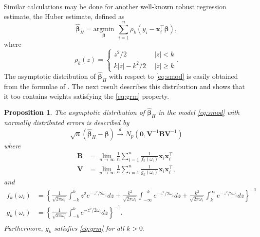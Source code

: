 \documentclass[12pt]{article}
\newtheorem{proposition}{Proposition}
\newcommand{\bl}[1]{{\mathbf #1}}
\newcommand{\bs}[1]{\boldsymbol #1}
\begin{document}
Similar calculations may be done for another well-known robust regression estimate, the Huber estimate, defined as
\begin{equation*}
    \hat{\bs{\beta}}_{H} = \underset{\bs{\beta}}{\mathrm{argmin}}~~ \sum_{i=1}^n \rho_k (y_i - \bl{x}_i^\top \bs{\beta}),
\end{equation*}
where
\begin{equation*}
    \rho_k(z) = \left\{\begin{array}{lc}
         z^2/2 & ~~|z| < k \\
         k|z| - k^2 / 2 & ~~|z| \geq k
    \end{array}\right. .
\end{equation*}
The asymptotic distribution of $\hat{\bs{\beta}}_H$ with respect to \eqref{eq:smod} is easily obtained from the formulae of \cite{huber_robust_1964}. The next result describes this distribution and shows that it too contains weights satisfying the \eqref{eq:grm} property. 
\begin{proposition}\label{prop:huber}
The asymptotic distribution of $\hat{\bs{\beta}}_{H}$ in the model \eqref{eq:smod} with normally distributed errors is described by
\begin{equation*}
    \sqrt{n}(\hat{\bs{\beta}}_{H} - \bs{\beta}) \overset{d}{\longrightarrow} N_p(\bl{0}, \bl{V}^{-1} \bl{B} \bl{V}^{-1})
\end{equation*}
where
\begin{equation*}
    \begin{aligned}
        \bl{B} &= \lim_{n \rightarrow \infty} \frac{1}{n} \sum_{i=1}^n \frac{1}{f_{k}(\omega_i)} \bl{x}_i \bl{x}_i^\top \\
        \bl{V} &= \lim_{n \rightarrow \infty} \frac{1}{n} \sum_{i=1}^n \frac{1}{g_{k}(\omega_i)} \bl{x}_i \bl{x}_i^\top,
    \end{aligned}
\end{equation*}
and
\begin{equation*}
    \begin{aligned}
        f_k(\omega_i) &= \left\{\frac{1}{\sqrt{2\pi\omega_i}}\int_{-k}^k z^2 e^{-z^2/2\omega_i} dz + \frac{k^2}{\sqrt{2\pi\omega_i}} \int_{-\infty}^{-k} e^{-z^2/2\omega_i} dz + \frac{k^2}{\sqrt{2\pi\omega_i}} \int_{k}^\infty e^{-z^2/2\omega_i} dz\right\}^{-1}\\
        g_k(\omega_i) &= \left\{\frac{1}{\sqrt{2\pi\omega_i}}\int_{-k}^k e^{-z^2/2\omega_i} dz\right\}^{-1} .\\
    \end{aligned}
\end{equation*}
Furthermore, $g_{k}$ satisfies \eqref{eq:grm} for all $k > 0$.
\end{proposition}
\end{document}
